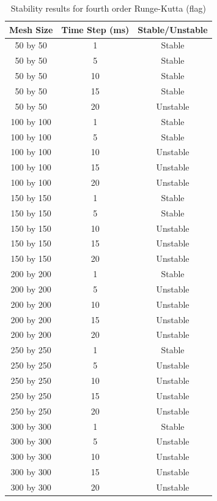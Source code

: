 \begin{table}[tp]
   \begin{minipage}{\textwidth}
      \begin{center}
         \begin{tabular}{c|c|c}
           Mesh Size & Time Step (ms) & Stable/Unstable\\
           \hline
           50 by 50 & 1 & Stable\\
           50 by 50 & 5 & Stable\\
           50 by 50 & 10 & Stable\\
           50 by 50 & 15 & Stable\\
           50 by 50 & 20 & Unstable\\
           100 by 100 & 1 & Stable\\
           100 by 100 & 5 & Stable\\
           100 by 100 & 10 & Unstable\\
           100 by 100 & 15 & Unstable\\
           100 by 100 & 20 & Unstable\\           
           150 by 150 & 1 & Stable\\
           150 by 150 & 5 & Stable\\
           150 by 150 & 10 & Unstable\\
           150 by 150 & 15 & Unstable\\
           150 by 150 & 20 & Unstable\\           
           200 by 200 & 1 & Stable\\
           200 by 200 & 5 & Unstable\\
           200 by 200 & 10 & Unstable\\
           200 by 200 & 15 & Unstable\\
           200 by 200 & 20 & Unstable\\           
           250 by 250 & 1 & Stable\\
           250 by 250 & 5 & Unstable\\
           250 by 250 & 10 & Unstable\\
           250 by 250 & 15 & Unstable\\
           250 by 250 & 20 & Unstable\\           
           300 by 300 & 1 & Stable\\
           300 by 300 & 5 & Unstable\\
           300 by 300 & 10 & Unstable\\
           300 by 300 & 15 & Unstable\\
           300 by 300 & 20 & Unstable\\
         \end{tabular}
      \end{center}
   \end{minipage}
   \caption{Stability results for fourth order Runge-Kutta (flag)}
   \label{tab:rk4 stability flag}
\end{table}

